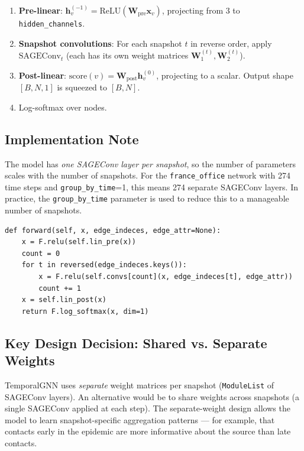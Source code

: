 \documentclass[12pt,a4paper]{report}
\newcommand{\bh}{\mathbf{h}}
\newcommand{\bx}{\mathbf{x}}
\newcommand{\bW}{\mathbf{W}}
\begin{document}
\begin{enumerate}
  \item \textbf{Pre-linear}: $\bh_v^{(-1)} = \text{ReLU}(\bW_{\text{pre}} \bx_v)$,
    projecting from 3 to \texttt{hidden\_channels}.
  \item \textbf{Snapshot convolutions}: For each snapshot $t$ in reverse order,
    apply $\text{SAGEConv}_t$ (each has its own weight matrices $\bW_1^{(t)},
    \bW_2^{(t)}$).
  \item \textbf{Post-linear}: $\text{score}(v) = \bW_{\text{post}} \bh_v^{(0)}$,
    projecting to a scalar. Output shape $[B, N, 1]$ is squeezed to $[B, N]$.
  \item Log-softmax over nodes.
\end{enumerate}

\subsection{Implementation Note}

The model has \emph{one SAGEConv layer per snapshot}, so the number of parameters
scales with the number of snapshots. For the \texttt{france\_office} network with
274 time steps and \texttt{group\_by\_time}=1, this means 274 separate SAGEConv
layers. In practice, the \texttt{group\_by\_time} parameter is used to reduce
this to a manageable number of snapshots.

\begin{lstlisting}[caption={TemporalGNN forward pass (from \texttt{gnn/temporal\_gnn.py}).}]
def forward(self, x, edge_indeces, edge_attr=None):
    x = F.relu(self.lin_pre(x))
    count = 0
    for t in reversed(edge_indeces.keys()):
        x = F.relu(self.convs[count](x, edge_indeces[t], edge_attr))
        count += 1
    x = self.lin_post(x)
    return F.log_softmax(x, dim=1)
\end{lstlisting}

\subsection{Key Design Decision: Shared vs. Separate Weights}

TemporalGNN uses \emph{separate} weight matrices per snapshot
(\texttt{ModuleList} of SAGEConv layers). An alternative would be to share
weights across snapshots (a single SAGEConv applied at each step). The
separate-weight design allows the model to learn snapshot-specific aggregation
patterns — for example, that contacts early in the epidemic are more informative
about the source than late contacts.
\end{document}
